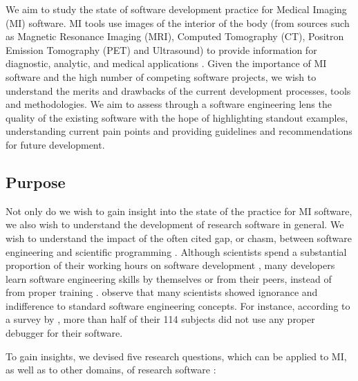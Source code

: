 \documentclass[final, 3p, times, authoryear]{elsarticle}
\begin{document}
We aim to study the state of software development practice for Medical Imaging
(MI) software.  MI tools use images of the interior of the body (from sources
such as Magnetic Resonance Imaging (MRI), Computed Tomography (CT), Positron
Emission Tomography (PET) and Ultrasound) to provide information for diagnostic,
analytic, and medical applications \citep{FDA2021, enwiki:1034887445,
Zhang2008}.  Given the importance of MI software and the high number of
competing software projects, we wish to understand the merits and drawbacks of
the current development processes, tools and methodologies.  We aim to assess
through a software engineering lens the quality of the existing software with
the hope of highlighting standout examples, understanding current pain points
and providing guidelines and recommendations for future development.

\subsection{Purpose} \label{sec_motivation}

Not only do we wish to gain insight into the state of the practice for MI
software, we also wish to understand the development of research software in
general. We wish to understand the impact of the often cited gap, or chasm,
between software engineering and scientific programming \citep{Storer2017}.
Although scientists spend a substantial proportion of their working hours on
software development \citep{Hannay2009, Prabhu2011}, many developers learn
software engineering skills by themselves or from their peers, instead of from
proper training \citep{Hannay2009}. \citet{Hannay2009} observe that many
scientists showed ignorance and indifference to standard software engineering
concepts. For instance, according to a survey by \citet{Prabhu2011}, more than
half of their 114 subjects did not use any proper debugger for their software.

To gain insights, we devised five research questions, which can be applied
to MI, as well as to other domains, of research software \citep{SmithEtAl2021}:
\end{document}
